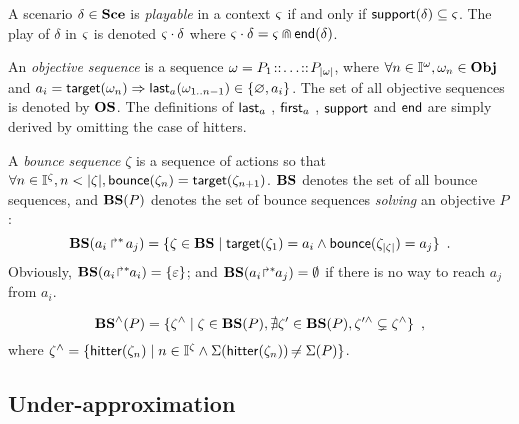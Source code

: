 A scenario $\delta \in \mathbf{Sce}$ is \emph{playable} in a context $\varsigma$ if and only if $\mathsf{support}(\delta) \subseteq \varsigma$. 
The play of $\delta$ in $\varsigma$ is denoted $\varsigma \cdot \delta$ where $\varsigma \cdot \delta = \varsigma \Cap \mathsf{end}(\delta)$.

\begin{definition}
\label{def:OS}
  An \emph{objective sequence} is a sequence $\omega = P_1 \!::\! \dots \!::\! P_{|\omega|}$,
  where $\forall n \in \mathbb{I}^{\omega}, \omega_n \in \mathbf{Obj}$ and $a_i = \mathsf{target}(\omega_n) \Rightarrow \mathsf{last}_a(\omega_{1..n-1}) \in \{ \varnothing, a_i \}$.
  The set of all objective sequences is denoted by $\mathbf{OS}$.
  The definitions of $\mathsf{last}_a$ , $\mathsf{first}_a$ , $\mathsf{support}$  and $\mathsf{end}$ 
  are simply derived by omitting the case of hitters.
\end{definition}

\begin{definition}
\label{def:bs}
  A \emph{bounce sequence} $\zeta$ is a sequence of actions so that $\forall n \in \mathbb{I}^{\zeta}, n < |\zeta|, \mathsf{bounce}(\zeta_{n}) = \mathsf{target}(\zeta_{n+1})$.
  $\mathbf{BS}$ denotes the set of all bounce sequences, and
  $\mathbf{BS}(P)$ denotes the set of bounce sequences \emph{solving} an objective $P$:
  \[
    \mathbf{BS}(\mbox{$a_i\Rsh^*\!a_j$}) = \{ \zeta \in \mathbf{BS} \mid \mathsf{target}(\zeta_1)= a_i \wedge \mathsf{bounce}(\zeta_{|\zeta|}) = a_j \} \enspace.
  \]
  Obviously, $\mathbf{BS}({a_i\!\Rsh^*\!\!a_i}) = \{\varepsilon\}$; and $\mathbf{BS}({a_i\!\Rsh^*\!\!a_j}) = \emptyset$ if there is no way to reach $a_j$ from $a_i$.
\end{definition}

\begin{definition}[$\aBS:\Obj \mapsto \powerset(\Proc)$]
\label{def:aBS}
  \[
    \mathbf{BS}^\wedge(P) = \{ \zeta^\wedge \mid \zeta \in \mathbf{BS}(P), \nexists \zeta' \in \mathbf{BS}(P), \zeta'^\wedge \subsetneq \zeta^\wedge \} \enspace,
  \]
  where $\zeta^\wedge = \{ \mathsf{hitter}(\zeta_n) \mid  n \in \mathbb{I}^{\zeta} \wedge \Sigma(\mathsf{hitter}(\zeta_n)) \not\nobreak\mkern -2mu = \Sigma(P) \}$.
\end{definition}



\subsection{Under-approximation}

